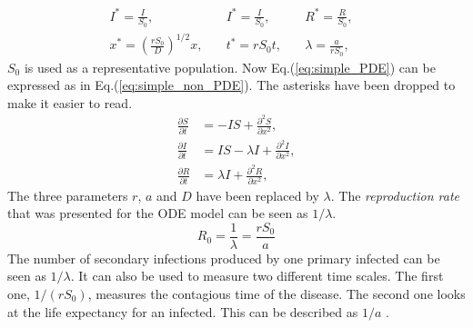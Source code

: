 \documentclass[%
twoside,                 %
final,                   %
chapterprefix=true,      %
open=right               %
10pt]{book}
\begin{document}
\begin{equation} \label{eq:constants_nondimensional}
	\begin{aligned}
	I^* =\frac{I}{S_0},&\quad I^* = \frac{I}{S_0},&\quad R^*= \frac{R}{S_0},&\\
	x^* =\left(\frac{rS_0}{D}\right)^{1/2}x,&\quad t^*=rS_0t,&\quad \lambda =\frac{a}{rS_0},&
	\end{aligned}
\end{equation}
$S_0$ is used as a representative population. Now Eq.(\ref{eq:simple_PDE}) can be expressed as in Eq.(\ref{eq:simple_non_PDE}). The asterisks have been dropped to make it easier to read.
\begin{equation} \label{eq:simple_non_PDE}
	\begin{aligned}
	\frac{\partial S}{\partial t} &= -IS + \frac{\partial^2 S}{\partial x^2},\\
	\frac{\partial I}{\partial t} &= IS- \lambda I + \frac{\partial^2 I}{\partial x^2},\\
	\frac{\partial R}{\partial t} &= \lambda I + \frac{\partial^2 R}{\partial x^2},
	\end{aligned}
\end{equation}
The three parameters $r$, $a$ and $D$ have been replaced by $\lambda$. The \emph{reproduction rate} that was presented for the ODE model can be seen as $1/\lambda $.
\begin{equation} \label{eq:reproduction_rate_PDF}
R_0 = \frac{1}{\lambda} = \frac{rS_0}{a}
\end{equation}
The number of secondary infections produced by one primary infected can be seen as $1/\lambda$. It can also be used to measure two different time scales. The first one, $1/(rS_0)$, measures the contagious time of the disease. The second one looks at the life expectancy for an infected. This can be described as $1/a$ \cite{murray2003mathematical}. 
\end{document}
